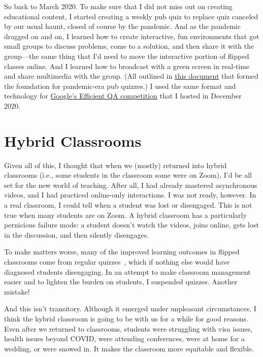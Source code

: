 So back to March 2020. To make sure that I did not miss out on
creating educational content, I started creating a weekly pub quiz to
replace quiz canceled by our usual haunt, closed of course by the
pandemic.  And as the pandemic dragged on and on, I learned how to
create interactive, fun environments that got small groups to discuss
problems, come to a solution, and then share it with the group---the
same thing that I'd need to move the interactive portion of flipped
classes online.  And I
learned how to broadcast with a green screen in real-time and share
multimedia with the group.  (All outlined in \href{https://docs.google.com/document/d/1YesfpZ_-b2mT3BkTrlOLD5epZxz4uF1DqUkHZHrn344/edit?usp=sharing}{this document} that formed
the foundation for pandemic-era pub quizzes.)  I used the same
format and technology for \href{https://sites.google.com/view/qanta/past-events/neurips-2020-efficient-qa}{Google's Efficient QA competition} that I
hosted in December 2020.


\section{Hybrid Classrooms}

Given all of this, I thought that when we (mostly) returned into hybrid
classrooms (i.e., some students in the classroom some were on Zoom), I'd be
all set for the new world of teaching.  After all, I had already mastered
asynchronous videos, and I had practiced online-only interactions.  I was not
ready, however.  In a real classroom, I could tell when a student was lost or
disengaged.  This is not true when many students are on Zoom.  A hybrid
classroom has a particularly pernicious failure mode: a student doesn't watch
the videos, joins online, gets lost in the discussion, and then silently
disengages.

To make matters worse, many of the improved learning outcomes in
flipped classrooms come from regular quizzes~\cite{tune-13}, which if
nothing else would have diagnosed students disengaging. In an attempt
to make classroom management easier and to lighten the burden on
students, I suspended quizzes.  Another mistake!

And this isn't transitory.  Although it emerged under unpleasant
circumstances, I think the hybrid classroom is going to be with us for
a while for good reasons.  Even after we returned to classrooms,
students were struggling with visa issues, health issues beyond COVID,
were attending conferences, were at home for a wedding, or were snowed
in.  It makes the classroom more equitable and flexible.

